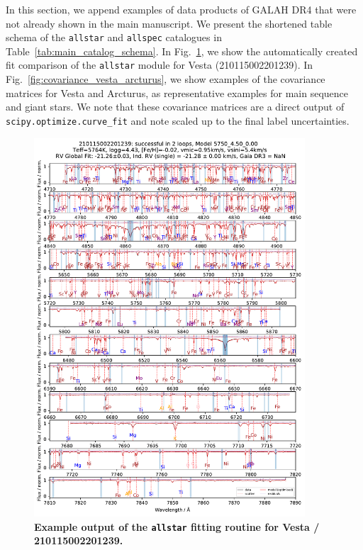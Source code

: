 \documentclass[
  journal=pasa,
  manuscript=research-paper, %
  year=2024,
  volume=37
]{cup-journal}
\begin{document}
In this section, we append examples of data products of GALAH DR4 that were not already shown in the main manuscript. We present the shortened table schema of the \texttt{allstar} and \texttt{allspec} catalogues in Table~\ref{tab:main_catalog_schema}. In Fig.~\ref{fig:210115002201239_allstar_fit_comparison}, we show the automatically created fit comparison of the \texttt{allstar} module for Vesta (210115002201239). In Fig.~\ref{fig:covariance_vesta_arcturus}, we show examples of the covariance matrices for Vesta and Arcturus, as representative examples for main sequence and giant stars. We note that these covariance matrices are a direct output of \texttt{scipy.optimize.curve\_fit} and note scaled up to the final label uncertainties.



\begin{figure}[ht]
 \centering
 \includegraphics[width=0.9\textwidth]{figures/210115002201239_allstar_fit_comparison.pdf} \caption{\textbf{Example output of the \texttt{allstar} fitting routine for Vesta / 210115002201239.}} \label{fig:210115002201239_allstar_fit_comparison}
\end{figure}
\end{document}
